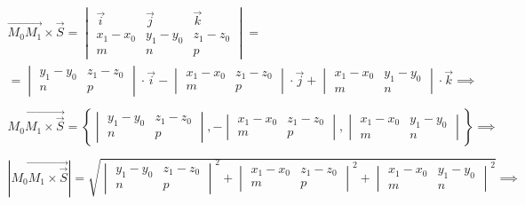 \begin{gather*}
  \overrightarrow{M_0M_1} \times \vec{S} = 
  \begin{vmatrix}
    \vec{i} & \vec{j} & \vec{k} \\
    x_1 - x_0 & y_1 - y_0 & z_1 - z_0 \\
    m & n & p
  \end{vmatrix} = \\
  = \begin{vmatrix}
    y_1 - y_0 & z_1 - z_0 \\
    n & p
  \end{vmatrix} \cdot \vec{i} -
  \begin{vmatrix}
    x_1 - x_0 & z_1 - z_0 \\
    m & p
  \end{vmatrix} \cdot \vec{j} + 
  \begin{vmatrix}
    x_1 - x_0 & y_1 - y_0 \\
    m & n
  \end{vmatrix} \cdot \vec{k} \implies \\
  \\
  \overrightarrow{M_0M_1 \times \vec{S}} = 
  \left\{
  \begin{vmatrix}
    y_1 - y_0 & z_1 - z_0 \\
    n & p
  \end{vmatrix},
   - \begin{vmatrix}
    x_1 - x_0 & z_1 - z_0 \\
    m & p
  \end{vmatrix}, 
  \begin{vmatrix}
    x_1 - x_0 & y_1 - y_0 \\
    m & n
  \end{vmatrix}
  \right\} \implies \\
  \\
  |\overrightarrow{M_0M_1 \times \vec{S}}| = 
  \sqrt{
  \begin{vmatrix}
    y_1 - y_0 & z_1 - z_0 \\
    n & p
  \end{vmatrix}^2 +
  \begin{vmatrix}
    x_1 - x_0 & z_1 - z_0 \\
    m & p
  \end{vmatrix}^2 + 
  \begin{vmatrix}
    x_1 - x_0 & y_1 - y_0 \\
    m & n
  \end{vmatrix}^2
  } \implies \\

\end{gather*}
